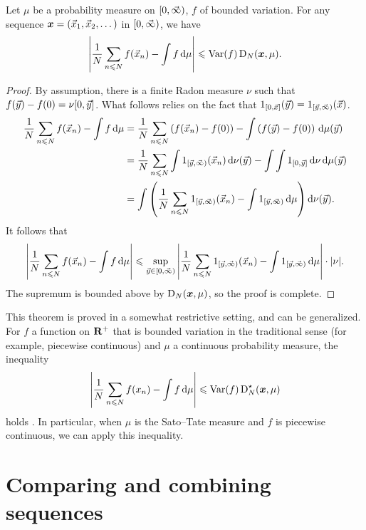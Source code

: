 \begin{theorem}
Let $\mu$ be a probability measure on $[0,\vec{\infty})$, $f$ of bounded variation. 
For any sequence ${\boldsymbol x} = (\vec{x}_1,\vec{x}_2,\dots)$ in $[0,\vec{\infty})$, we have 
\[
	\left| \frac{1}{N} \sum_{n\leqslant N} f(\vec{x}_n) - \int f\, \mathrm{d}\mu \right| \leqslant \operatorname{Var}(f) \operatorname{D}_N({\boldsymbol x},\mu) .
\]
\end{theorem}
\begin{proof}
By assumption, there is a finite Radon measure $\nu$ such that 
$f(\vec{y}) - f(0) = \nu[0,\vec{y}]$. What follows relies on the fact 
that $1_{[0,\vec{x}]}(\vec{y}) = 1_{[\vec{y},\vec{\infty})}(\vec{x})$. 
\begin{align*}
	\frac{1}{N} \sum_{n\leqslant N} f(\vec{x}_n) - \int f\, \mathrm{d}\mu 
		&= \frac{1}{N} \sum_{n\leqslant N} \left(f(\vec{x}_n) - f(0)\right) - \int \left(f(\vec{y}) - f(0)\right)\, \mathrm{d}\mu(\vec{y}) \\
		&= \frac{1}{N} \sum_{n\leqslant N} \int 1_{[\vec{y},\vec{\infty})}(\vec{x}_n)\, \mathrm{d} \nu(\vec{y}) - \int \int 1_{[0,\vec{y}]}\, \mathrm{d}\nu \, \mathrm{d}\mu(\vec{y}) \\
		&= \int \left(\frac{1}{N} \sum_{n\leqslant N} 1_{[\vec{y},\vec{\infty})}(\vec{x}_n) - \int 1_{[\vec{y},\vec{\infty})}\, \mathrm{d}\mu \right) \mathrm{d}\nu(\vec{y}) .
\end{align*}
It follows that 
\[
	\left| \frac{1}{N} \sum_{n\leqslant N} f(\vec{x}_n) - \int f\, \mathrm{d}\mu \right|
		\leqslant \sup_{\vec{y}\in [0,\vec{\infty})} \left| \frac{1}{N} \sum_{n\leqslant N} 1_{[\vec{y},\vec{\infty})}(\vec{x}_n) - \int 1_{[\vec{y},\vec{\infty})}\, \mathrm{d}\mu\right| \cdot |\nu| .
\]
The supremum is bounded above by $\operatorname{D}_N({\boldsymbol x},\mu)$, so the proof is complete. 
\end{proof}

This theorem is proved in a somewhat restrictive setting, and can be 
generalized. For $f$ a function on $\mathbf{R}^+$ that is bounded variation in 
the traditional sense (for example, piecewise continuous) and $\mu$ a 
continuous probability measure, the inequality 
\[
	\left| \frac{1}{N} \sum_{n\leqslant N} f(x_n) - \int f\, \mathrm{d}\mu\right| \leqslant \operatorname{Var}(f) \operatorname{D}_N^\star({\boldsymbol x},\mu) 
\]
holds \cite[Ch.~2, Th.~5.1]{kuipers-niederreiter-1974}. In particular, when 
$\mu$ is the Sato--Tate measure and $f$ is piecewise continuous, we can apply 
this inequality. 





\section{Comparing and combining sequences}

